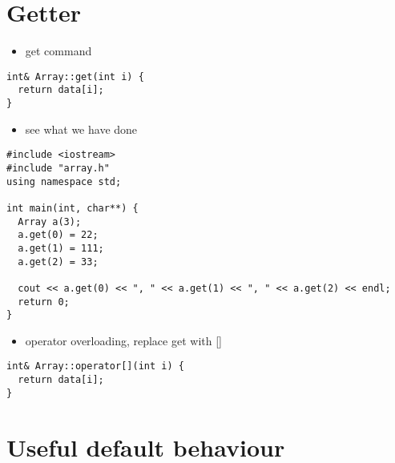 \documentclass[11pt]{article}
\begin{document}
\section{Getter}
\label{sec:orgaa9d0d1}
\begin{itemize}
\item get command
\end{itemize}
\begin{verbatim}
int& Array::get(int i) {
  return data[i];
}
\end{verbatim}
\begin{itemize}
\item see what we have done
\end{itemize}
\begin{verbatim}
#include <iostream>
#include "array.h"
using namespace std;

int main(int, char**) {
  Array a(3);
  a.get(0) = 22;
  a.get(1) = 111;
  a.get(2) = 33;

  cout << a.get(0) << ", " << a.get(1) << ", " << a.get(2) << endl;
  return 0;
}
\end{verbatim}
\begin{itemize}
\item operator overloading, replace get with []
\end{itemize}
\begin{verbatim}
int& Array::operator[](int i) {
  return data[i];
}
\end{verbatim}

\section{Useful default behaviour}
\label{sec:orgf28af97}
\end{document}
